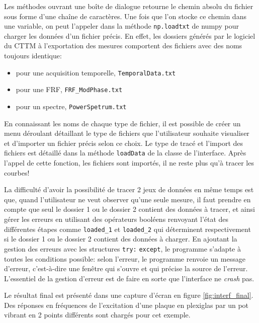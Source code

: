 \documentclass[a4paper,11pt]{article}
\begin{document}
Les méthodes ouvrant une boîte de dialogue retourne le chemin absolu du fichier sous forme d'une chaîne de caractères. Une fois que l'on stocke ce chemin dans une variable, on peut l'appeler dans la méthode \verb|np.loadtxt| de numpy pour charger les données d'un fichier précis. En effet, les dossiers générés par le logiciel du CTTM à l'exportation des mesures comportent des fichiers avec des noms toujours identique: 
\begin{itemize}
	\item pour une acquisition temporelle, \verb|TemporalData.txt|
	\item pour une FRF, \verb|FRF_ModPhase.txt|
	\item pour un spectre, \verb|PowerSpetrum.txt|
\end{itemize}

En connaissant les noms de chaque type de fichier, il est possible de créer un menu déroulant détaillant le type de fichiers que l'utilisateur souhaite visualiser et d'importer un fichier précis selon ce choix. Le type de tracé et l'import des fichiers est détaillé dans la méthode 	\verb|loadData| de la classe de l'interface. Après l'appel de cette fonction, les fichiers sont importés, il ne reste plus qu'à tracer les courbes!

La difficulté d'avoir la possibilité de tracer 2 jeux de données en même temps est que, quand l'utilisateur ne veut observer qu'une seule mesure, il faut prendre en compte que seul le dossier 1 ou le dossier 2 contient des données à tracer, et ainsi gérer les erreurs en utilisant des opérateurs booléens renvoyant l'état des différentes étapes comme \verb|loaded_1| et \verb|loaded_2| qui déterminent respectivement si le dossier 1 ou le dossier 2 contient des données à charger. En ajoutant la gestion des erreurs avec les structures \verb|try:| \verb|except|, le programme s'adapte à toutes les conditions possible: selon l'erreur, le programme renvoie un message d'erreur, c'est-à-dire une fenêtre qui s'ouvre et qui précise la source de l'erreur. L'essentiel de la gestion d'erreur est de faire en sorte que l'interface ne \textit{crash} pas. 

Le résultat final est présenté dans une capture d'écran en figure \ref{fig:interf_final}. Des réponses en fréquences de l'excitation d'une plaque en plexiglas par un pot vibrant en 2 points différents sont chargés pour cet exemple.
\end{document}
